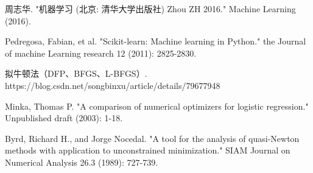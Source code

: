 \documentclass{SCIS2020cn}
\begin{document}


\begin{thebibliography}{99}

 周志华. "机器学习 (北京: 清华大学出版社) Zhou ZH 2016." Machine Learning (2016).

 Pedregosa, Fabian, et al. "Scikit-learn: Machine learning in Python." the Journal of machine Learning research 12 (2011): 2825-2830.

 拟牛顿法（DFP、BFGS、L-BFGS）. https://blog.csdn.net/songbinxu/article/details/79677948

 Minka, Thomas P. "A comparison of numerical optimizers for 
logistic regression." Unpublished draft (2003): 1-18.

 Byrd, Richard H., and Jorge Nocedal. "A tool for the analysis of quasi-Newton methods with application to unconstrained minimization." SIAM Journal on Numerical Analysis 26.3 (1989): 727-739.
\end{thebibliography}
\end{document}
